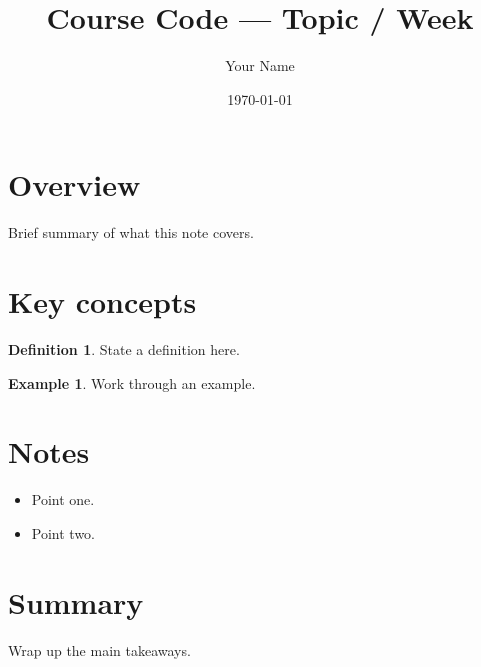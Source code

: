 \documentclass[11pt,a4paper]{article}
\title{Course Code --- Topic / Week}
\author{Your Name}
\date{\today}
\theoremstyle{definition}
\newtheorem{definition}{Definition}[section]
\newtheorem{example}{Example}[section]
\theoremstyle{plain}
\begin{document}
\maketitle
\tableofcontents
\bigskip

\section{Overview}
Brief summary of what this note covers.

\section{Key concepts}
\begin{definition}
State a definition here.
\end{definition}

\begin{example}
Work through an example.
\end{example}

\section{Notes}
\begin{itemize}[leftmargin=*]
    \item Point one.
    \item Point two.
\end{itemize}

\section{Summary}
Wrap up the main takeaways.
\end{document}
